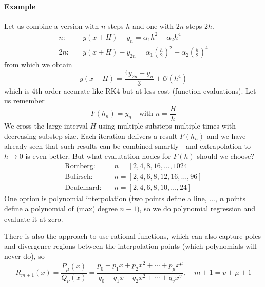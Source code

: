 \paragraph{Example} Let us combine a version with $n$ steps $h$ and one with $2n$ steps $2h$.
\begin{equation}
  \begin{aligned}
    n:& \quad y(x+H) - y_n = \alpha_1 h^2 + \alpha_2 h^4 \\
    2n:& \quad y(x+H) - y_{2n} = \alpha_1 \left( \frac{h}{2} \right)^2 + \alpha_2 \left( \frac{h}{2} \right)^4
  \end{aligned}
\end{equation}
from which we obtain
\begin{equation}
  y(x + H) = \frac{4y_{2n}-y_n}{3} + \mathcal{O}(h^4)
\end{equation}
which is 4th order accurate like RK4 but at less cost (function evaluations).
Let us remember
\begin{equation}
  F(h_n) = y_n \quad \text{with } n = \frac{H}{h}
\end{equation}
We cross the large interval $H$ using multiple substeps multiple times with decreasing substep size. Each iteration
delivers a result $F(h_n)$ and we have already seen that such results can be combined smartly - and extrapolation
to $h\rightarrow 0$ is even better. But what evalutation nodes for $F(h)$ should we choose?
\begin{equation}
  \begin{aligned}
    \text{Romberg}:& \quad n = [2,4,8,16,\dots,1024] \\
    \text{Bulirsch}:& \quad n = [2,4,6,8,12,16,\dots,96] \\
    \text{Deufelhard}:& \quad n = [2,4,6,8,10,\dots,24]
  \end{aligned}
\end{equation}
One option is polynomial interpolation (two points define a line, ..., $n$ points define
a polynomial of (max) degree $n-1$), so we do polynomial regression and evaluate it at zero.

There is also the approach to use rational functions,
which can also capture poles and divergence regions between the interpolation points (which 
polynomials will never do), so
\begin{equation}
  R_{m+1}(x)=\frac{P_\mu(x)}{Q_\nu(x)}=\frac{p_0+p_1 x+p_2 x^2+\cdots+p_\mu x^\mu}{q_0+q_1 x+q_2 x^2+\cdots+q_v x^v}, \quad m+1=v+\mu+1
\end{equation}

